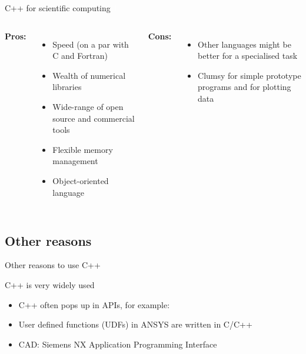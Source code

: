 \documentclass[compress]{beamer}
\newcommand{\includefullwidthgx}[2][]{%
	\vspace{-9.5pt}
	\noindent\makebox[\columnwidth]{\texttt{[image: \#2]}}%
}%
\newcounter{image}
\begin{document}
\begin{frame}{C++ for scientific computing}
\textcolor{white}{1} \\
\begin{columns}
\textbf{Pros:}
        \begin{itemize}

        	\item \textcolor{sthlmGreen}{Speed (on a par with C and Fortran)}
        	\item \textcolor{sthlmGreen}{Wealth of numerical libraries}
        	\item \textcolor{sthlmGreen}{Wide-range of open
        		source and commercial tools}
        	\item \textcolor{sthlmGreen}{Flexible memory management}
			\item \textcolor{sthlmGreen}{Object-oriented language}
        \end{itemize}

	

\textbf{Cons:}
        \begin{itemize}
        	
        	\item \textcolor{sthlmRed}{Other languages might be better for a specialised task}
        	\item \textcolor{sthlmRed}{Clumsy for simple prototype programs and for plotting data}
        \end{itemize}


\end{columns}	

\end{frame}

\subsection{Other reasons}

\begin{frame}{Other reasons to use C++}
\begin{block}{C++ is very widely used}
	\begin{itemize}
		\item C++ often pops up in APIs, for example:
		\item User defined functions (UDFs) in ANSYS are written in C/C++
		\item CAD: Siemens NX Application Programming Interface
	\end{itemize}
\end{block}
\includefullwidthgx{figures/cad_fluent2.jpg}
\end{frame}
\end{document}
